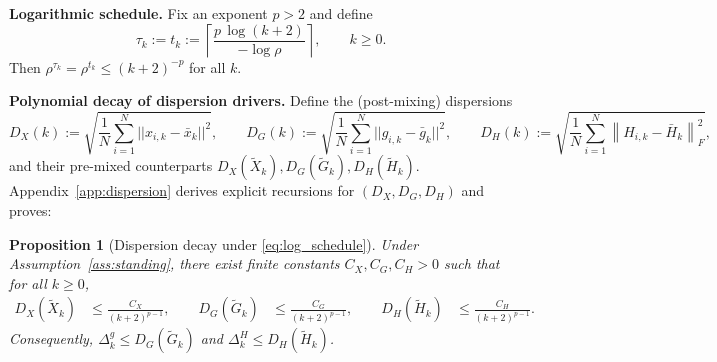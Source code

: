 \documentclass[11pt,a4paper]{article}
\def\norm#1{||#1||}%
\newtheorem{proposition}[theorem]{Proposition}
\newcommand{\norm}[1]{\left\|#1\right\|}
\newcommand{\normF}[1]{\left\|#1\right\|_F}
\begin{document}
	\noindent\textbf{Logarithmic schedule.}
	Fix an exponent $p>2$ and define
	\begin{equation}\label{eq:log_schedule}
		\tau_k:=t_k:=\left\lceil \frac{p\,\log(k+2)}{-\log\rho}\right\rceil,\qquad k\ge 0.
	\end{equation}
	Then $\rho^{\tau_k}=\rho^{t_k}\le (k+2)^{-p}$ for all $k$.
	
	\noindent\textbf{Polynomial decay of dispersion drivers.}
	Define the (post-mixing) dispersions
	\[
	D_X(k):=\sqrt{\frac1N\sum_{i=1}^N\norm{x_{i,k}-\bar x_k}^2},\qquad
	D_G(k):=\sqrt{\frac1N\sum_{i=1}^N\norm{g_{i,k}-\bar g_k}^2},\qquad
	D_H(k):=\sqrt{\frac1N\sum_{i=1}^N\normF{H_{i,k}-\bar H_k}^2},
	\]
	and their pre-mixed counterparts $D_X(\tilde X_k),D_G(\tilde G_k),D_H(\tilde H_k)$.
	Appendix~\ref{app:dispersion} derives explicit recursions for $(D_X,D_G,D_H)$ and proves:
	
	\begin{proposition}[Dispersion decay under \eqref{eq:log_schedule}]\label{prop:dispersion_decay}
		Under Assumption~\ref{ass:standing}, there exist finite constants $C_X,C_G,C_H>0$ such that for all $k\ge 0$,
		\begin{align}
			D_X(\tilde X_k) &\le \frac{C_X}{(k+2)^{p-1}},\qquad
			D_G(\tilde G_k) &\le \frac{C_G}{(k+2)^{p-1}},\qquad
			D_H(\tilde H_k) &\le \frac{C_H}{(k+2)^{p-1}}.
		\end{align}
		Consequently, $\Delta^g_k\le D_G(\tilde G_k)$ and $\Delta^H_k\le D_H(\tilde H_k)$.
	\end{proposition}
	
\end{document}
